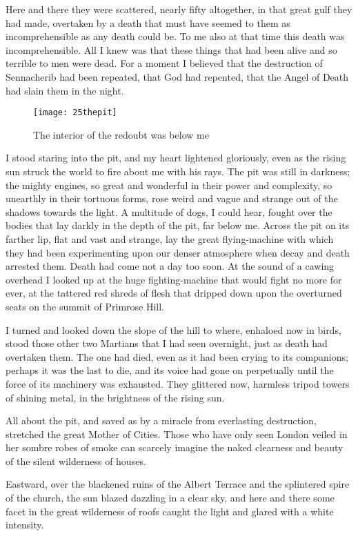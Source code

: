 Here and there they were scattered, nearly fifty altogether, in that great gulf they had made, overtaken by a death that must have seemed to them as incomprehensible as any death could be. To me also at that time this death was incomprehensible. All I knew was that these things that had been alive and so terrible to men were dead. For a moment I believed that the destruction of Sennacherib had been repeated, that God had repented, that the Angel of Death had slain them in the night.

\begin{figure}[tbp]
\centering
\texttt{[image: 25thepit]}
\caption{The interior of the redoubt was below me}
\end{figure}

I stood staring into the pit, and my heart lightened gloriously, even as the rising sun struck the world to fire about me with his rays. The pit was still in darkness; the mighty engines, so great and wonderful in their power and complexity, so unearthly in their tortuous forms, rose weird and vague and strange out of the shadows towards the light. A multitude of dogs, I could hear, fought over the bodies that lay darkly in the depth of the pit, far below me. Across the pit on its farther lip, flat and vast and strange, lay the great flying-machine with which they had been experimenting upon our denser atmosphere when decay and death arrested them. Death had come not a day too soon. At the sound of a cawing overhead I looked up at the huge fighting-machine that would fight no more for ever, at the tattered red shreds of flesh that dripped down upon the overturned seats on the summit of Primrose Hill.

I turned and looked down the slope of the hill to where, enhaloed now in birds, stood those other two Martians that I had seen overnight, just as death had overtaken them. The one had died, even as it had been crying to its companions; perhaps it was the last to die, and its voice had gone on perpetually until the force of its machinery was exhausted. They glittered now, harmless tripod towers of shining metal, in the brightness of the rising sun.



All about the pit, and saved as by a miracle from everlasting destruction, stretched the great Mother of Cities. Those who have only seen London veiled in her sombre robes of smoke can scarcely imagine the naked clearness and beauty of the silent wilderness of houses.

Eastward, over the blackened ruins of the Albert Terrace and the splintered spire of the church, the sun blazed dazzling in a clear sky, and here and there some facet in the great wilderness of roofs caught the light and glared with a white intensity.

